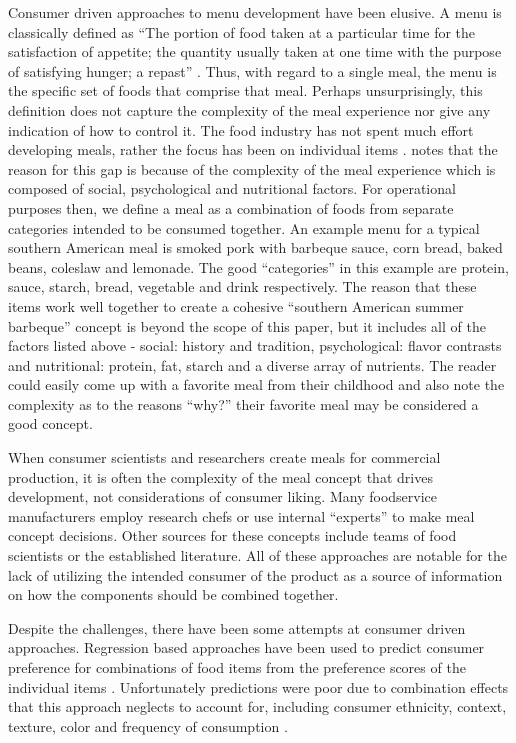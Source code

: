 Consumer driven approaches to menu development have been elusive.  A menu is classically defined as “The portion of food taken at a particular time for the satisfaction of appetite; the quantity usually taken at one time with the purpose of satisfying hunger; a repast” \citep{Webster1913}.  Thus, with regard to a single meal, the menu is the specific set of foods that comprise that meal.  Perhaps unsurprisingly, this definition does not capture the complexity of the meal experience nor give any indication of how to control it.  The food industry has not spent much effort developing meals, rather the focus has been on individual items \citep{Meiselman2000}.  \citet{Meiselman2000} notes that the reason for this gap is because of the complexity of the meal experience which is composed of social, psychological \citep[see esp.][chap. 2]{Lawless2010}  and nutritional factors.  For operational purposes then, we define a meal as a combination of foods from separate categories intended to be consumed together.  
An example menu for a typical southern American meal is smoked pork with barbeque sauce, corn bread, baked beans, coleslaw and lemonade.  The good “categories” in this example are protein, sauce, starch, bread, vegetable and drink respectively.  The reason that these items work well together to create a cohesive “southern American summer barbeque” concept is beyond the scope of this paper, but it includes all of the factors listed above - social: history and tradition, psychological: flavor contrasts \citep{Lawless1977,Lawless1979,Lawless1987,Lawless2010,Lawless2000} and nutritional: protein, fat, starch and a diverse array of nutrients.  The reader could easily come up with a favorite meal from their childhood and also note the complexity as to the reasons “why?” their favorite meal may be considered a good concept.   

When consumer scientists and researchers create meals for commercial production, it is often the complexity of the meal concept that drives development, not considerations of consumer liking.   Many foodservice manufacturers employ research chefs or use internal “experts” to make meal concept decisions.  Other sources for these concepts include teams of food scientists or the established literature.  All of these approaches are notable for the lack of utilizing the intended consumer of the product as a source of information on how the components should be combined together.  

Despite the challenges, there have been some attempts at consumer driven approaches.  Regression based approaches have been used to predict consumer preference for combinations of food items from the preference scores of the individual items \citep{Eindhoven1959,Hedderley1995,Moskowitz1995}.  Unfortunately predictions were poor due to combination effects that this approach neglects to account for, including consumer ethnicity, context, texture, color and frequency of consumption \citep{Eindhoven1959,Marshall2003,Niewind1986,Pilgrim1961}.  

